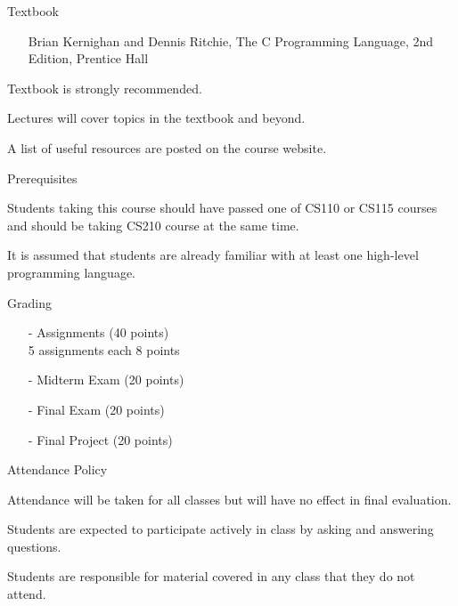 \documentclass[compress]{beamer}
\begin{document}
\begin{slide}
	\begin{block}{Textbook}

	\begin{itemize}
	\item[] Brian Kernighan and Dennis Ritchie, The C Programming Language, 2nd Edition, Prentice Hall
	\end{itemize}

	Textbook is \alert{strongly} recommended.

	Lectures will cover topics in the textbook and beyond.

	A list of useful resources are posted on the course website.

	\end{block}
\end{slide}

\begin{slide}
	\begin{block}{Prerequisites}

	Students taking this course should have passed one of CS110 or CS115 courses and should be taking CS210 course at the same time.

	It is assumed that students are already familiar with at least one high-level programming language.

	\end{block}
\end{slide}

\begin{slide}
	\begin{block}{Grading}

	\begin{itemize}
	\item[-] Assignments (40 points)\\5 assignments each 8 points
	\item[-] Midterm Exam (20 points)
	\item[-] Final Exam (20 points)
	\item[-] Final Project (20 points)
	\end{itemize}

	\end{block}
\end{slide}

\begin{slide}
	\begin{block}{Attendance Policy}

	Attendance will be taken for all classes but will have no effect in final evaluation.

	Students are expected to participate actively in class by asking and answering questions.

	Students are responsible for material covered in any class that they do not attend.

	\end{block}
\end{slide}
\end{document}
